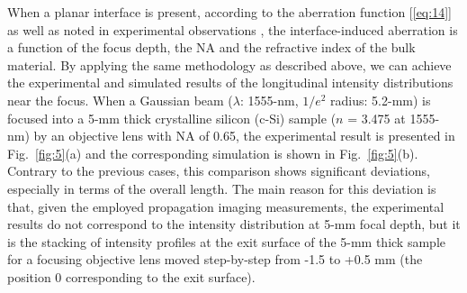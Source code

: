 \documentclass[9pt,twocolumn,twoside]{osajnl}
\begin{document}
When a planar interface is present, according to the aberration function [\eqref{eq:14}] as well as noted in experimental observations \cite{li2016quantitative}, the interface-induced aberration is a function of the focus depth, the NA and the refractive index of the bulk material. By applying the same methodology as described above, we can achieve the experimental and simulated results of the longitudinal intensity distributions near the focus. When a Gaussian beam ($\lambda$: 1555-nm, $1/e^2$ radius: 5.2-mm) is focused into a 5-mm thick crystalline silicon (c-Si) sample ($n$ = 3.475 at 1555-nm) by an objective lens with NA of 0.65, the experimental result is presented in Fig.~\ref{fig:5}(a) and the corresponding simulation is shown in Fig.~\ref{fig:5}(b). Contrary to the previous cases, this comparison shows significant deviations, especially in terms of the overall length. The main reason for this deviation is that, given the employed propagation imaging measurements, the experimental results do not correspond to the intensity distribution at 5-mm focal depth, but it is the stacking of intensity profiles at the exit surface of the 5-mm thick sample for a focusing objective lens moved step-by-step from -1.5 to +0.5 mm (the position 0 corresponding to the exit surface). %
\end{document}
